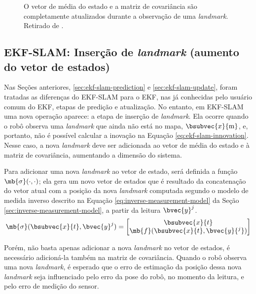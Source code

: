 \begin{figure}[h]
  \centering
  
  \caption[Elementos do vetor média e da matriz de covariância do Filtro de Kalman Estendido de um sistema SLAM alterados no passo de atualização]{O vetor de média do estado e a matriz de covariância são completamente atualizados durante a observação de uma \textit{landmark}. Retirado de \cite[p.~8]{jsola}.}
  \label{fig:ekf-slam-update}
\end{figure}

\subsection{EKF-SLAM: Inserção de \textit{landmark} (aumento do vetor de estados)}
\label{sec:ekf-slam-landmark-insertion}
Nas Seções anteriores, \ref{sec:ekf-slam-prediction} e \ref{sec:ekf-slam-update}, foram tratadas as diferenças 
do EKF-SLAM para o EKF, nas já conhecidas pelo usuário comum do EKF, etapas de predição e atualização. No entanto, em EKF-SLAM uma nova operação aparece: a etapa de inserção de \textit{landmark}. Ela ocorre quando o robô observa uma \textit{landmark} que ainda não está no mapa, $\bsubvec{x}{\mathrm{m}}$, e, portanto, não é possível calcular a inovação na Equação \ref{eq:ekf-slam-innovation}. Nesse caso, a nova \textit{landmark} deve ser adicionada ao vetor de média do estado e à matriz de covariância, aumentando a dimensão do sistema.

Para adicionar uma nova \textit{landmark} ao vetor de estado, será definida 
a função $\mb{\sigma}(\cdot, \cdot)$; ela gera um novo vetor de estados 
que é resultado da concatenação do vetor atual com a posição da nova 
\textit{landmark} computada segundo o modelo de medida inverso descrito na Equação \ref{eq:inverse-measurement-model} da Seção \ref{sec:inverse-measurement-model}, a partir da leitura $\bvec{y}^j$.
\begin{equation}
      \mb{\sigma}(\bsubvec{x}{t}, \bvec{y}^j) = \begin{bmatrix}
        \bsubvec{x}{t} \\
        \mb{f}(\bsubvec{x}{t}, \bvec{y}{^j})
      \end{bmatrix}
\end{equation}

Porém, não basta apenas adicionar a nova \textit{landmark} no vetor de estados, é necessário adicioná-la também na matriz de covariância. Quando 
o robô observa uma nova \textit{landmark}, é esperado que o erro de estimação 
da posição dessa nova \textit{landmark} seja influenciado pelo erro da 
pose do robô, no momento da leitura, e pelo erro de medição do sensor. 

